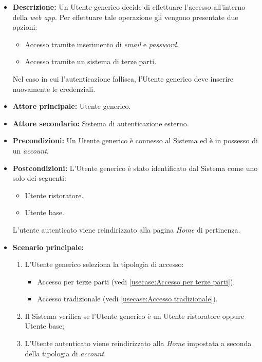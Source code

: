 \label{usecase:Effettua accesso}

\begin{itemize}
	\item \textbf{Descrizione:} Un Utente generico decide di effettuare l'accesso all'interno della \textit{web app}. Per effettuare tale
	operazione gli vengono presentate due opzioni:
	\begin{itemize}
		\item Accesso tramite inserimento di \textit{email} e \textit{password}.
		\item Accesso tramite un sistema di terze parti.
	\end{itemize}
	Nel caso in cui l'autenticazione fallisca, l'Utente generico deve inserire nuovamente le credenziali.

	\item \textbf{Attore principale:} Utente generico.
	\item \textbf{Attore secondario:} Sistema di autenticazione esterno.
	\item \textbf{Precondizioni:}
	      Un Utente generico è connesso al Sistema ed è in possesso di un \textit{account}.
	\item \textbf{Postcondizioni:}
	      L'Utente generico è stato identificato dal Sistema come uno solo dei seguenti:
	      \begin{itemize}
		      \item Utente ristoratore.
		      \item Utente base.
	      \end{itemize}
		  L'utente autenticato viene reindirizzato alla pagina \textit{Home} di pertinenza.

	\item \textbf{Scenario principale:}
	      \begin{enumerate}
		      \item L'Utente generico seleziona la tipologia di accesso: 

			  \begin{itemize}
				\item Accesso per terze parti (vedi \autoref{usecase:Accesso per terze parti}).
				\item Accesso tradizionale (vedi \autoref{usecase:Accesso tradizionale}).
			  \end{itemize}

		      \item Il Sistema verifica se l'Utente generico è un Utente ristoratore oppure Utente base;
		      \item L'Utente autenticato viene reindirizzato alla \textit{Home} impostata a seconda della tipologia di \textit{account}.		
	      \end{enumerate}
		

\end{itemize}

